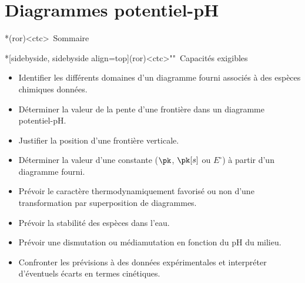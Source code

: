 \documentclass[../../main/main.tex]{subfiles}
\begin{document}
\setcounter{chapter}{6}


\chapter{Diagrammes potentiel-pH}


\begin{tcb}*(ror)<ctc>{\iconsomm~Sommaire}
	\vspace{-15pt}
	\minitoc
	\vspace{-25pt}
\end{tcb}

\begin{tcb}*[sidebyside, sidebyside align=top](ror)<ctc>""{\iconhow~Capacités exigibles}
	\small
	\begin{itemize}[label=\rcheck]
		\item Identifier les différents domaines d'un diagramme fourni associés à
		      des espèces chimiques données.
		\item Déterminer la valeur de la pente d'une frontière dans un diagramme
		      potentiel-pH.
		\item Justifier la position d'une frontière verticale.
		\item Déterminer la valeur d'une constante ($\pk$, $\pk[s]$ ou $E^\circ$)
		      à partir d'un diagramme fourni.
	\end{itemize}
	\tcblower
	\begin{itemize}[label=\rcheck]
		\item Prévoir le caractère thermodynamiquement favorisé ou non d'une
		      transformation par superposition de diagrammes.
		\item Prévoir la stabilité des espèces dans l'eau.
		\item Prévoir une dismutation ou médiamutation en fonction du pH du milieu.
		\item Confronter les prévisions à des données expérimentales et
		      interpréter d'éventuels écarts en termes cinétiques.
	\end{itemize}
\end{tcb}
\vspace{-15pt}
\end{document}

